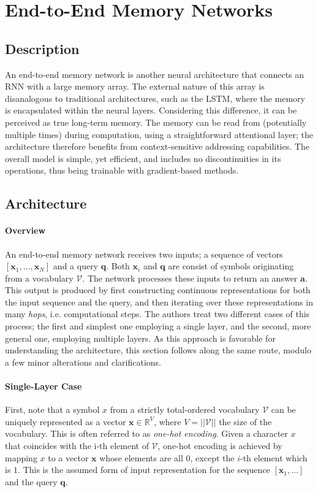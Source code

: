 \documentclass[]{article}
\begin{document}
\section{End-to-End Memory Networks}
\label{E2E}
\subsection{Description}
An end-to-end memory network is another neural architecture that connects an RNN with a large memory array. The external nature of this array is disanalogous to traditional architectures, such as the LSTM, where the memory is encapsulated within the neural layers. Considering this difference, it can be perceived as true long-term memory. The memory can be read from (potentially multiple times) during computation, using a straightforward attentional layer; the architecture therefore benefits from context-sensitive addressing capabilities. The overall model is simple, yet efficient, and includes no discontinuities in its operations, thus being trainable with gradient-based methods.

\subsection{Architecture}
\paragraph{Overview}
An end-to-end memory network receives two inputs; a sequence of vectors $[\pmb{x}_1,\dots,\pmb{x}_N]$ and a query $\pmb{q}$. Both $\pmb{x}_i$ and $\pmb{q}$ are consist of symbols originating from a vocabulary $\mathcal{V}$. The network processes these inputs to return an answer $\pmb{a}$. This output is produced by first constructing continuous representations for both the input sequence and the query, and then iterating over these representations in many \textit{hops}, i.e. computational steps. The authors treat two different cases of this process; the first and simplest one employing a single layer, and the second, more general one, employing multiple layers. As this approach is favorable for understanding the architecture, this section follows along the same route, modulo a few minor alterations and clarifications.

\paragraph{Single-Layer Case} First, note that a symbol $x$ from a strictly total-ordered vocabulary $\mathcal{V}$ can be uniquely represented as a vector $\pmb{x} \in \mathbb{R}^{V}$, where $V = ||\mathcal{V}||$ the size of the vocabulary. This is often referred to as \textit{one-hot encoding}. Given a character $x$ that coincides with the i-th element of $\mathcal{V}$, one-hot encoding is achieved by mapping $x$ to a vector $\pmb{x}$ whose elements are all $0$, except the $i$-th element which is $1$. This is the assumed form of input representation for the sequence $[\pmb{x}_1,\dots]$ and the query $\pmb{q}$. 
\end{document}
